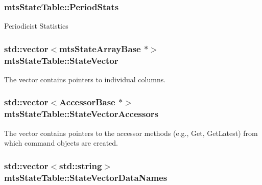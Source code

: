 \hypertarget{classmts_state_table_ae4914598ee6ee5a523f8ecc7008c5ceb}{
\subsubsection[{Period\-Stats}]{ mts\-State\-Table\-::\-Period\-Stats}}\label{classmts_state_table_ae4914598ee6ee5a523f8ecc7008c5ceb}
Periodicist Statistics \hypertarget{classmts_state_table_a744da952e79c0336d4208a841ae35aae}{
\subsubsection[{State\-Vector}]{\setlength{\rightskip}{0pt plus 5cm}std\-::vector$<${\bf mts\-State\-Array\-Base} $\ast$$>$ mts\-State\-Table\-::\-State\-Vector\hspace{0.3cm}{\ttfamily [protected]}}}\label{classmts_state_table_a744da952e79c0336d4208a841ae35aae}
The vector contains pointers to individual columns. \hypertarget{classmts_state_table_a5eb62dbdd241d316b7a18ef22f68ae91}{
\subsubsection[{State\-Vector\-Accessors}]{\setlength{\rightskip}{0pt plus 5cm}std\-::vector$<${\bf Accessor\-Base} $\ast$$>$ mts\-State\-Table\-::\-State\-Vector\-Accessors\hspace{0.3cm}{\ttfamily [protected]}}}\label{classmts_state_table_a5eb62dbdd241d316b7a18ef22f68ae91}
The vector contains pointers to the accessor methods (e.\-g., Get, Get\-Latest) from which command objects are created. \hypertarget{classmts_state_table_ad7b3a968771bc125b3865a4547ec92fe}{
\subsubsection[{State\-Vector\-Data\-Names}]{\setlength{\rightskip}{0pt plus 5cm}std\-::vector$<$std\-::string$>$ mts\-State\-Table\-::\-State\-Vector\-Data\-Names\hspace{0.3cm}{\ttfamily [protected]}}}\label{classmts_state_table_ad7b3a968771bc125b3865a4547ec92fe}
